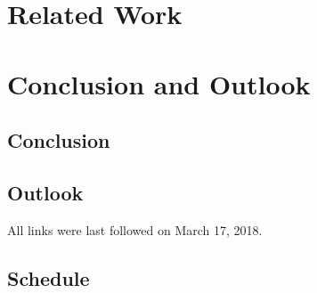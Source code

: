 \documentclass[a4paper,10pt,titlepage]{report}
\begin{document}


\chapter{Related Work}

\chapter{Conclusion and Outlook}
\section*{Conclusion}

\section*{Outlook}

\printbibliography

All links were last followed on March 17, 2018.



\newpage
\appendix


\section{Schedule}

\end{document}
